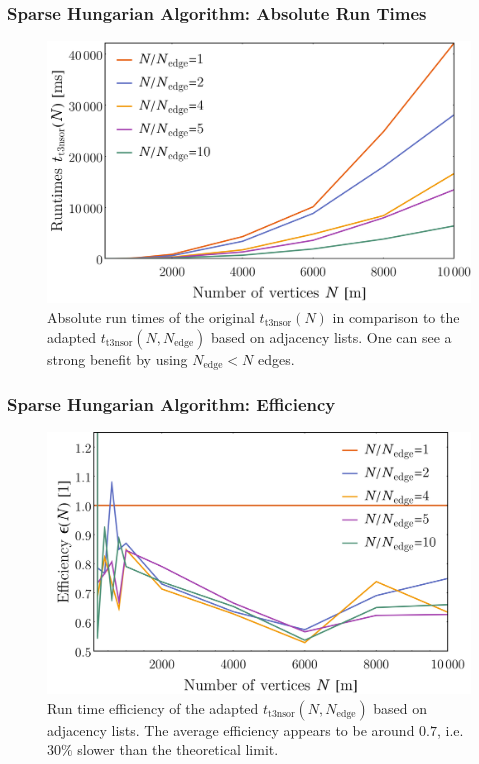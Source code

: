 \documentclass[9pt, english]{beamer}
\begin{document}
\begin{frame}[fragile]
\frametitle{Sparse Hungarian Algorithm: Absolute Run Times}
\begin{figure}
\centering
\includegraphics[width=.85\textwidth]{ha_t3nsor_runtimes_absolute.png}
\caption{Absolute run times of the original \(t_{\text{t3nsor}}(N)\) in comparison to the adapted \(t_{\text{t3nsor}}(N,N_{\text{edge}})\) based on adjacency lists. One can see a strong benefit by using \(N_{\text{edge}} < N\) edges.}
\end{figure}
\end{frame}

\begin{frame}[fragile]
\frametitle{Sparse Hungarian Algorithm: Efficiency}
\begin{figure}
\centering
\includegraphics[width=.85\textwidth]{ha_t3nsor_runtimes_efficiency.png}
\caption{Run time efficiency of the adapted \(t_{\text{t3nsor}}(N,N_{\text{edge}})\) based on adjacency lists. The average efficiency appears to be around \(0.7\), i.e. \(30\%\) slower than the theoretical limit.}
\end{figure}
\end{frame}
\end{document}

